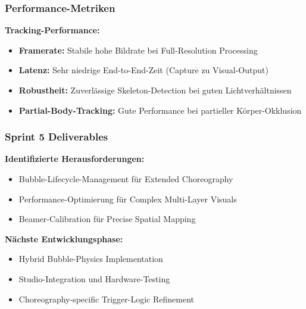 \subsubsection{Performance-Metriken}

\textbf{Tracking-Performance:}
\begin{itemize}
    \item \textbf{Framerate:} Stabile hohe Bildrate bei Full-Resolution Processing
    \item \textbf{Latenz:} Sehr niedrige End-to-End-Zeit (Capture zu Visual-Output)
    \item \textbf{Robustheit:} Zuverlässige Skeleton-Detection bei guten Lichtverhältnissen
    \item \textbf{Partial-Body-Tracking:} Gute Performance bei partieller Körper-Okklusion
\end{itemize}

\subsubsection{Sprint 5 Deliverables}

\textbf{Identifizierte Herausforderungen:}
\begin{itemize}
    \item Bubble-Lifecycle-Management für Extended Choreography
    \item Performance-Optimierung für Complex Multi-Layer Visuals
    \item Beamer-Calibration für Precise Spatial Mapping
\end{itemize}

\textbf{Nächste Entwicklungsphase:}
\begin{itemize}
    \item Hybrid Bubble-Physics Implementation
    \item Studio-Integration und Hardware-Testing
    \item Choreography-specific Trigger-Logic Refinement
\end{itemize}
